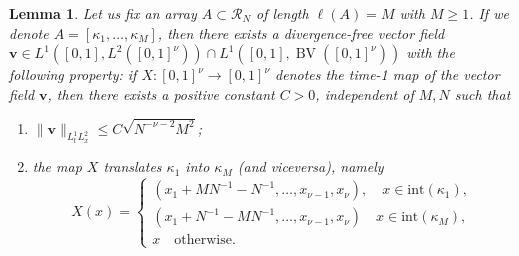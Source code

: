 \documentclass[10pt,a4paper]{amsart}
\newtheorem{lemma}{Lemma}
\DeclareMathOperator{\BV}{BV}
\begin{document}
\begin{lemma}\label{lem:first:exchange}
   Let us fix an array $A\subset\mathcal{R}_N$ of length $\ell(A)=M$ with $M\geq 1$. If we denote $A=[\kappa_1,\dots,\kappa_M]$, then there exists a divergence-free vector field $\mathbf v\in L^1([0,1],L^2([0,1]^\nu))\cap  L^1([0,1],\BV([0,1]^\nu))$ with the following property: if $X:[0,1]^\nu\rightarrow [0,1]^\nu$ denotes the time-1 map of the vector field $\mathbf v$, then there exists a positive constant $C>0$, independent of $M,N$ such that 
    \begin{enumerate}
        \item $\|\mathbf v\|_{L^1_tL^2_x}\leq C \sqrt{N^{-\nu-2}M^2}$;
        \item  the map $X$ translates $\kappa_1$ into $\kappa_M$ (and viceversa), namely \begin{equation*}
        X(x)=\begin{cases} (x_1+MN^{-1}-N^{-1},\dots,x_{\nu-1}, x_\nu ), \quad x\in \text{int}(\kappa_1), \\
        (x_1+N^{-1}-MN^{-1},\dots,x_{\nu-1}, x_\nu) \quad x\in \text{int}(\kappa_M),\\
        x \quad \text{otherwise}.
             \end{cases}
    \end{equation*}
    \end{enumerate} 
   
\end{lemma}
\end{document}
